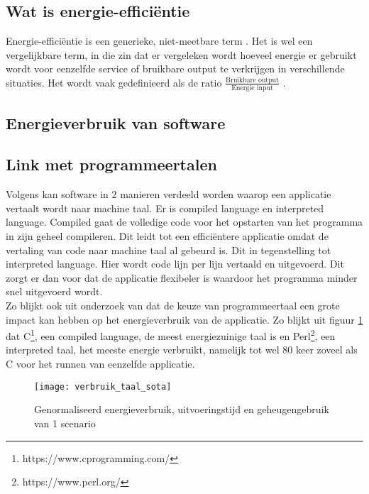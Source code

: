 \subsection{Wat is energie-efficiëntie}
Energie-efficiëntie is een generieke, niet-meetbare term \autocite{Patterson1996}. Het is wel een vergelijkbare term, in die zin dat er vergeleken wordt hoeveel energie er gebruikt wordt voor eenzelfde service of bruikbare output te verkrijgen in verschillende situaties. Het wordt vaak gedefinieerd als de ratio 
$\frac{\text{Bruikbare output}}{\text{Energie input}}$ .



\subsection{Energieverbruik van software}
\subsection{Link met programmeertalen}
\autocite{Manner2022}

Volgens \textcite{Jain2024} kan software in 2 manieren verdeeld worden waarop een applicatie vertaalt wordt naar machine taal. Er is compiled language en interpreted language. Compiled gaat de volledige code voor het opstarten van het programma in zijn geheel compileren. Dit leidt tot een efficiëntere applicatie omdat de vertaling van code naar machine taal al gebeurd is. Dit in tegenstelling tot interpreted language. Hier wordt code lijn per lijn vertaald en uitgevoerd. Dit zorgt er dan voor dat de applicatie flexibeler is waardoor het programma minder snel uitgevoerd wordt.\\

Zo blijkt ook uit onderzoek van \textcite{Pereira2017} dat de keuze van programmeertaal een grote impact kan hebben op het energieverbruik van de applicatie. Zo blijkt uit figuur \ref{verbruik_taal_sota} dat C\footnote{https://www.cprogramming.com/}, een compiled language, de meest energiezuinige taal is en Perl\footnote{https://www.perl.org/}, een interpreted taal, het meeste energie verbruikt, namelijk tot wel 80 keer zoveel als C voor het runnen van eenzelfde applicatie. \\

\begin{figure}[H]
    \texttt{[image: verbruik\_taal\_sota]}
    \centering
    \caption{Genormaliseerd energieverbruik, uitvoeringstijd en geheugengebruik van 1 scenario \autocite{Pereira2017}}
    
    \label{verbruik_taal_sota}
\end{figure}


